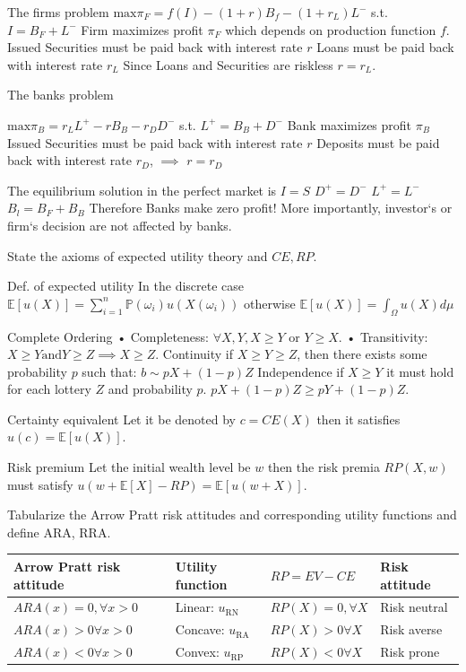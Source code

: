 The firms problem
\( \text{max} \pi_F = f(I) - (1+r)B_f - (1+r_L)L^{-} \)
s.t. \( I = B_F + L^{-} \)
Firm maximizes profit \( \pi_F \) which depends on production function \( f \).
Issued Securities must be paid back with interest rate \( r \)
Loans must be paid back with interest rate \( r_L \)
Since Loans and Securities are riskless \( r = r_L \).

The banks problem

\( \text{max}\pi_B = r_L L^{+} - rB_B - r_D D^{-} \)
s.t. \( L^{+} = B_B + D^{-} \)
Bank maximizes profit \( \pi_B \)
Issued Securities must be paid back with interest rate \( r \)
Deposits must be paid back with interest rate \( r_D \), \( \implies \) \( r = r_D \)


The equilibrium solution in the perfect market is
\( I = S \)
\( D^{+} = D^{-} \)
\( L^{+} = L^{-} \)
\( B_l = B_F + B_B \)
Therefore Banks make zero profit! More importantly, investor‘s
or firm‘s decision are not affected by banks.


State the axioms of expected utility theory
and \( CE, RP \).

Def. of expected utility
In the discrete case
\( \mathbb{E}[u(X)] = \sum_{i=1}^n \mathbb{P}(\omega_i)u(X(\omega_i)) \)
otherwise
\( \mathbb{E}[u(X)] = \int_\Omega u(X)d\mu \)

Complete Ordering
• Completeness:
\( \forall X, Y, X \geq Y \) or \( Y \geq X \).
• Transitivity:
\( X \geq Y \text{and} Y \geq Z \implies X \geq Z \).
Continuity
if \( X \geq Y \geq Z \), then there exists some probability \( p \)
such that: \( b \sim pX + (1-p)Z \)
Independence
if \( X \geq Y \) it must hold for each lottery \( Z \) and probability \( p \).
\( pX + (1-p)Z \geq pY + (1-p)Z \).

Certainty equivalent 
Let it be denoted by \( c = CE(X) \) then it satisfies
\( u(c) = \mathbb{E}[u(X)] \).

Risk premium
Let the initial wealth level be \( w \) then the risk premia \( RP(X, w) \) must satisfy 
\( u(w + \mathbb{E}[X] - RP) = \mathbb{E}[u(w + X)] \).

Tabularize the Arrow Pratt risk attitudes and corresponding utility functions
and define ARA, RRA.

\begin{tabular}{|l|l|l|l|}
\hline
Arrow Pratt risk attitude & Utility function & \( RP = EV - CE \) & Risk attitude \\ \hline
\( ARA(x) = 0, \forall x > 0 \) & Linear: \(u_{\text{RN}}\) & \( RP(X) = 0, \forall X \) & Risk neutral \\ \hline
\(ARA(x) > 0 \forall x > 0\) & Concave: \(u_{\text{RA}}\) & \(RP(X) > 0 \forall X\) & Risk averse \\ \hline
\(ARA(x) < 0 \forall x > 0\) & Convex: \(u_{\text{RP}}\) & \(RP(X) < 0 \forall X\) & Risk prone \\ \hline
\end{tabular}

